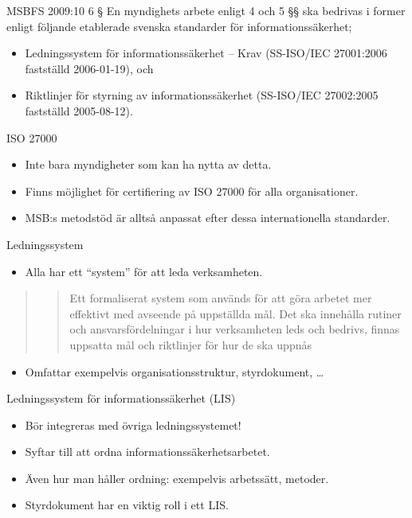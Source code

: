 \documentclass{beamer}
\begin{document}
\begin{frame}{MSBFS 2009:10}
  6 §   En myndighets arbete enligt 4 och 5 §§ ska bedrivas i former enligt 
  följande etablerade svenska standarder för informationssäkerhet;
  \begin{itemize}
    \item Ledningssystem för informationssäkerhet -- Krav (SS-ISO/IEC 
      27001:2006 fastställd 2006-01-19), och
    \item Riktlinjer för styrning av informationssäkerhet (SS-ISO/IEC 
      27002:2005 fastställd 2005-08-12).
  \end{itemize}
\end{frame}

\begin{frame}{ISO 27000}
  \begin{itemize}
    \item Inte bara myndigheter som kan ha nytta av detta.

    \item Finns möjlighet för certifiering av ISO 27000 för alla 
      organisationer.

    \item MSB:s metodstöd är alltså anpassat efter dessa internationella 
      standarder.

  \end{itemize}
\end{frame}

\begin{frame}{Ledningssystem}
  \begin{itemize}
    \item Alla har ett \enquote{system} för att leda verksamheten.
  \end{itemize}
  \begin{quote}
    \blockcquote{lis}[.]{Ett formaliserat system som används för att göra 
      arbetet mer effektivt med avseende på uppställda mål.
    Det ska innehålla rutiner och ansvarsfördelningar i hur verksamheten leds 
    och bedrivs, finnas uppsatta mål och riktlinjer för hur de ska uppnås}
  \end{quote}
  \begin{itemize}
    \item Omfattar exempelvis organisationsstruktur, styrdokument, \dots
  \end{itemize}
\end{frame}

\begin{frame}{Ledningssystem för informationssäkerhet (LIS)}
  \begin{itemize}
    \item Bör integreras med övriga ledningssystemet!
    \item Syftar till att ordna informationssäkerhetsarbetet.
    \item Även hur man håller ordning: exempelvis arbetssätt, metoder.
    \item Styrdokument har en viktig roll i ett LIS\@.
  \end{itemize}
\end{frame}
\end{document}
